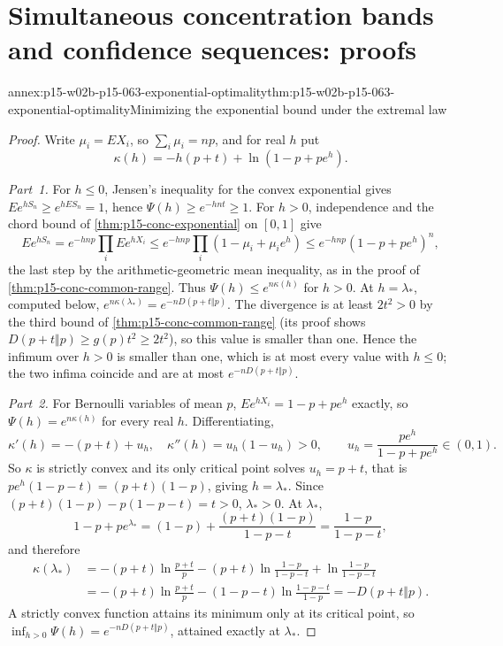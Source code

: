\section{Simultaneous concentration bands and confidence sequences: proofs}
\label{sec:annex-p15-w02b-p15-063}

\begin{annexitem}{annex:p15-w02b-p15-063-exponential-optimality}{thm:p15-w02b-p15-063-exponential-optimality}{Minimizing the exponential bound under the extremal law}
\begin{proof}
Write \(\mu_i=EX_i\), so \(\sum_i\mu_i=np\), and for real \(h\) put
\[
 \kappa(h)=-h(p+t)+\ln(1-p+pe^h).
\]

\emph{Part~1.} For \(h\leq0\), Jensen's inequality for the convex
exponential gives \(Ee^{hS_n}\geq e^{hES_n}=1\), hence
\(\Psi(h)\geq e^{-hnt}\geq1\). For \(h>0\), independence and the chord
bound of \cref{thm:p15-conc-exponential} on \([0,1]\) give
\[
 Ee^{hS_n}=e^{-hnp}\prod_iEe^{hX_i}
     \leq e^{-hnp}\prod_i(1-\mu_i+\mu_ie^h)
     \leq e^{-hnp}(1-p+pe^h)^n,
\]
the last step by the arithmetic-geometric mean inequality, as in the proof
of \cref{thm:p15-conc-common-range}. Thus \(\Psi(h)\leq e^{n\kappa(h)}\)
for \(h>0\). At \(h=\lambda_*\), computed below, \(e^{n\kappa(\lambda_*)}=
e^{-nD(p+t\Vert p)}\). The divergence is at least \(2t^2>0\) by the third
bound of \cref{thm:p15-conc-common-range} (its proof shows
\(D(p+t\Vert p)\geq g(p)t^2\geq2t^2\)), so this value is smaller than one.
Hence the infimum over \(h>0\) is smaller than one, which is at most every
value with \(h\leq0\); the two infima coincide and are at most
\(e^{-nD(p+t\Vert p)}\).

\emph{Part~2.} For Bernoulli variables of mean \(p\),
\(Ee^{hX_i}=1-p+pe^h\) exactly, so \(\Psi(h)=e^{n\kappa(h)}\) for every
real \(h\). Differentiating,
\[
 \kappa'(h)=-(p+t)+u_h,\quad
 \kappa''(h)=u_h(1-u_h)>0,\qquad u_h=\frac{pe^h}{1-p+pe^h}\in(0,1).
\]
So \(\kappa\) is strictly convex and its only critical point solves
\(u_h=p+t\), that is \(pe^h(1-p-t)=(p+t)(1-p)\), giving
\(h=\lambda_*\). Since \((p+t)(1-p)-p(1-p-t)=t>0\), \(\lambda_*>0\).
At \(\lambda_*\),
\[
 1-p+pe^{\lambda_*}=(1-p)+\frac{(p+t)(1-p)}{1-p-t}=\frac{1-p}{1-p-t},
\]
and therefore
\[
\begin{split}
 \kappa(\lambda_*)
 &=-(p+t)\ln\frac{p+t}{p}-(p+t)\ln\frac{1-p}{1-p-t}+\ln\frac{1-p}{1-p-t}\\
 &=-(p+t)\ln\frac{p+t}{p}-(1-p-t)\ln\frac{1-p-t}{1-p}
  =-D(p+t\Vert p).
\end{split}
\]
A strictly convex function attains its minimum only at its critical point,
so \(\inf_{h>0}\Psi(h)=e^{-nD(p+t\Vert p)}\), attained exactly at
\(\lambda_*\).


\end{proof}
\end{annexitem}
